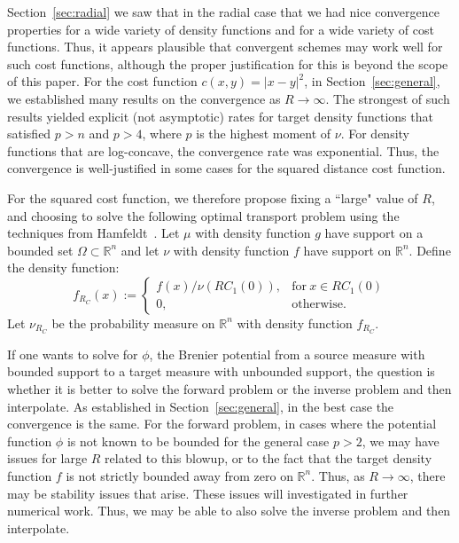 \documentclass{amsart}
\theoremstyle{lemma}
\theoremstyle{remark}
\begin{document}
Section~\ref{sec:radial} we saw that in the radial case that we had nice convergence properties for a wide variety of density functions and for a wide variety of cost functions. Thus, it appears plausible that convergent schemes may work well for such cost functions, although the proper justification for this is beyond the scope of this paper. For the cost function $c(x,y) = \vert x - y \vert^2$, in Section~\ref{sec:general}, we established many results on the convergence as $R \rightarrow \infty$. The strongest of such results yielded explicit (not asymptotic) rates for target density functions that satisfied $p > n$ and $p>4$, where $p$ is the highest moment of $\nu$. For density functions that are log-concave, the convergence rate was exponential. Thus, the convergence is well-justified in some cases for the squared distance cost function.

For the squared cost function, we therefore propose fixing a ``large" value of $R$, and choosing to solve the following optimal transport problem using the techniques from Hamfeldt~\cite{HamfeldtBVP2}. Let $\mu$ with density function $g$ have support on a bounded set $\Omega \subset \mathbb{R}^n$ and let $\nu$ with density function $f$ have support on $\mathbb{R}^n$. Define the density function:
\begin{equation}
f_{R_{C}}(x):=
\begin{cases}
f(x)/\nu(RC_{1}(0)), & \text{for} \ x \in RC_{1}(0) \\
0, &\text{otherwise}.
\end{cases}
\end{equation}
Let $\nu_{R_{C}}$ be the probability measure on $\mathbb{R}^n$ with density function $f_{R_{C}}$.

If one wants to solve for $\phi$, the Brenier potential from a source measure with bounded support to a target measure with unbounded support, the question is whether it is better to solve the forward problem or the inverse problem and then interpolate. As established in Section~\ref{sec:general}, in the best case the convergence is the same. For the forward problem, in cases where the potential function $\phi$ is not known to be bounded for the general case $p>2$, we may have issues for large $R$ related to this blowup, or to the fact that the target density function $f$ is not strictly bounded away from zero on $\mathbb{R}^n$. Thus, as $R \rightarrow \infty$, there may be stability issues that arise. These issues will investigated in further numerical work. Thus, we may be able to also solve the inverse problem and then interpolate.
\end{document}
